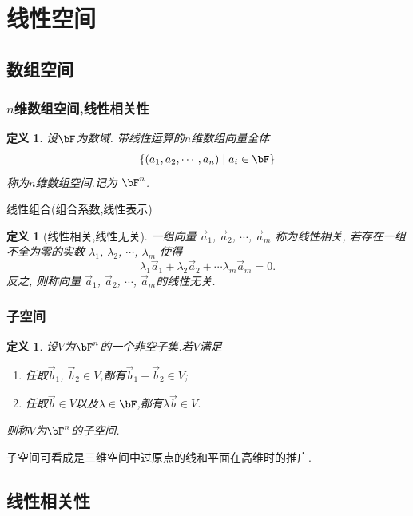 \documentclass{article}
\newtheorem{definition}[theorem]{定义}
\renewcommand{\blue }[1]{{\textcolor[rgb]{0,0,1}{#1}}}
\begin{document}
\section{线性空间}


\subsection{数组空间}

\subsubsection{$n$维数组空间,线性相关性}
\begin{definition}
设$\bF$为数域. 带线性运算的$n$维数组向量全体
\[\{(a_1,a_2,\cdots,a_n)\mid a_i\in \bF\}\]
称为\blue{$n$维数组空间}.记为 $\bF^n$.
\end{definition}
\blue{线性组合(组合系数,线性表示)}
\begin{definition}[线性相关,线性无关]
一组向量 $\vec{a}_1$, $\vec{a}_2$, $\cdots$, $\vec{a}_m$ 称为\blue{线性相关}, 若存在一组不全为零的实数 $\lambda_1$, $\lambda_2$, $\cdots$, $\lambda_m$ 使得
\[\lambda_1\vec{a}_1 + \lambda_2\vec{a}_2 + \cdots \lambda_m\vec{a}_m=0.\]
反之,	则称向量 $\vec{a}_1$, $\vec{a}_2$, $\cdots$, $\vec{a}_m$的\blue{线性无关}.
\end{definition}

\subsubsection{子空间}
\begin{definition}
设$V$为$\bF^n$的一个非空子集.若$V$满足
\begin{enumerate}
\item 任取$\vec{b}_1$, $\vec{b}_2\in V$,都有$\vec{b}_1+\vec{b}_2\in V$;
\item 任取$\vec{b}\in V$以及$\lambda\in \bF$,都有$\lambda\vec{b}\in V$.
\end{enumerate}
则称$V$为$\bF^n$的\blue{子空间}.
\end{definition}
子空间可看成是\blue{三维空间中过原点的线和平面在高维时的推广}.


\subsection{线性相关性}
\end{document}
